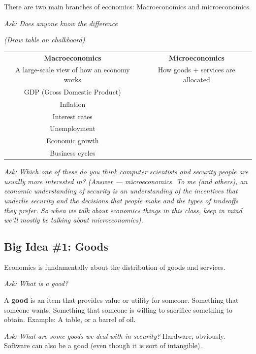 \documentclass[11pt]{article}
\begin{document}
There are two main branches of economics: Macroeconomics and microeconomics. 

{\it Ask: Does anyone know the difference}

{\it (Draw table on chalkboard)}

\begin{table}
    \centering
    \begin{tabular}{c|c}
        \hline
        {\bf Macroeconomics} & {\bf Microeconomics} \\
        A large-scale view of how an economy works & How goods + services are allocated   \\ 
        \hline
        GDP (Gross Domestic Product) & \\
        Inflation & \\
        Interest rates & \\
        Unemployment & \\ 
        Economic growth & \\ 
        Business cycles & \\ 

        \hline
    \end{tabular}
\end{table}
        
{\it Ask: Which one of these do you think computer scientists and security people are usually more interested in? (Answer --- microeconomics. To me (and others), an economic understanding of security is an understanding of the incentives that underlie security and the decisions that people make and the types of tradeoffs they prefer. So when we talk about economics things in this class, keep in mind we'll mostly be talking about microeconomics).}


\subsection{Big Idea \#1: Goods}

Economics is fundamentally about the distribution of goods and services. 

{\it Ask: What is a good?}

A {\bf good} is an item that provides value or utility for someone. Something that someone wants. Something that someone is willing to sacrifice something to obtain. Example: A table, or a barrel of oil.

{\it Ask: What are some goods we deal with in security?} Hardware, obviously. Software can also be a good (even though it is sort of intangible).
\end{document}
